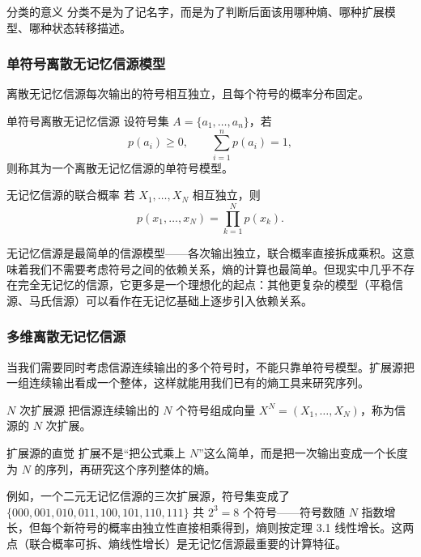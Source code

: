 \begin{keypoint}{分类的意义}
分类不是为了记名字，而是为了判断后面该用哪种熵、哪种扩展模型、哪种状态转移描述。
\end{keypoint}

\subsubsection{单符号离散无记忆信源模型}
离散无记忆信源每次输出的符号相互独立，且每个符号的概率分布固定。

\begin{definitionBox}{单符号离散无记忆信源}
设符号集 $A=\{a_1,\dots,a_n\}$，若
\[
 p(a_i)\ge 0,\qquad \sum_{i=1}^n p(a_i)=1,
\]
则称其为一个离散无记忆信源的单符号模型。
\end{definitionBox}

\begin{formulaBox}{无记忆信源的联合概率}
若 $X_1,\dots,X_N$ 相互独立，则
\[
 p(x_1,\dots,x_N)=\prod_{k=1}^N p(x_k).
\]
\end{formulaBox}

无记忆信源是最简单的信源模型——各次输出独立，联合概率直接拆成乘积。这意味着我们不需要考虑符号之间的依赖关系，熵的计算也最简单。但现实中几乎不存在完全无记忆的信源，它更多是一个理想化的起点：其他更复杂的模型（平稳信源、马氏信源）可以看作在无记忆基础上逐步引入依赖关系。

\subsubsection{多维离散无记忆信源}
当我们需要同时考虑信源连续输出的多个符号时，不能只靠单符号模型。扩展源把一组连续输出看成一个整体，这样就能用我们已有的熵工具来研究序列。

\begin{definitionBox}{$N$ 次扩展源}
把信源连续输出的 $N$ 个符号组成向量 $X^N=(X_1,\dots,X_N)$，称为信源的 $N$ 次扩展。
\end{definitionBox}

\begin{warningBox}{扩展源的直觉}
扩展不是“把公式乘上 $N$”这么简单，而是把一次输出变成一个长度为 $N$ 的序列，再研究这个序列整体的熵。
\end{warningBox}

例如，一个二元无记忆信源的三次扩展源，符号集变成了 $\{000,001,010,011,100,101,110,111\}$ 共 $2^3=8$ 个符号——符号数随 $N$ 指数增长，但每个新符号的概率由独立性直接相乘得到，熵则按定理 3.1 线性增长。这两点（联合概率可拆、熵线性增长）是无记忆信源最重要的计算特征。

